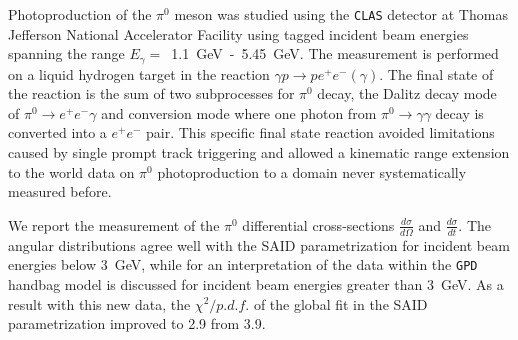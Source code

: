 \documentclass[12pt,a4paper]{report}
\author{Michael C. Kunkel}
\begin{document}
Photoproduction of the $\pi^0$ meson was studied using the \textsc{\texttt{CLAS}} detector at Thomas Jefferson National Accelerator Facility using tagged incident beam energies spanning the range $E_{\gamma}=$~1.1~GeV~-~5.45~GeV. The measurement is performed on a liquid hydrogen target in the reaction $\gamma p\to pe^+e^-(\gamma)$. The final state of the reaction is the sum of two subprocesses for $\pi^0$ decay, the Dalitz decay mode of $\pi^0\to e^+e^-\gamma$ and conversion mode where one photon from $\pi^0\to \gamma\gamma$ decay is converted into a $e^+e^-$ pair. This specific final state reaction avoided limitations caused by single prompt track triggering and allowed a kinematic range extension to the world data on $\pi^0$ photoproduction to a domain never systematically measured before.

We report the measurement of the $\pi^0$ differential cross-sections $\frac{d\sigma}{d\Omega}$ and $\frac{d\sigma}{dt}$. The angular distributions agree well with the SAID parametrization for incident beam energies below 3~GeV, while for an interpretation of the data within the \textsc{\texttt{GPD}} handbag model is discussed for incident beam energies greater than 3~GeV. As a result with this new data, the $\chi^2/p.d.f.$ of the global fit in the SAID parametrization improved to 2.9 from 3.9.
\end{document}
